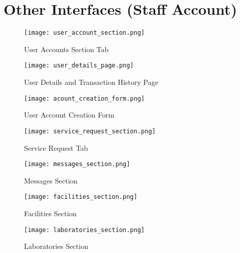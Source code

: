 %
%
%                 

\chapter{Other Interfaces (Staff Account)}
\label{sec:appendixa}



%

\begin{figure}[h]
	\centering 
	\texttt{[image: user\_account\_section.png]}
	\caption{User Accounts Section Tab}
	\label{fig:user_accounts_section}
\end{figure}

\begin{figure}[h]
	\centering 
	\texttt{[image: user\_details\_page.png]}
	\caption{User Details and Transaction History Page}
	\label{fig:user_details_page}
\end{figure}

\begin{figure}[h]
	\centering 
	\texttt{[image: acount\_creation\_form.png]}
	\caption{User Account Creation Form}
	\label{fig:acount_creation_form}
\end{figure}

\begin{figure}[h]
	\centering 
	\texttt{[image: service\_request\_section.png]}
	\caption{Service Request Tab}
	\label{fig:service request section}
\end{figure}

\begin{figure}[h]
	\centering 
	\texttt{[image: messages\_section.png]}
	\caption{Messages Section}
	\label{fig:messages section}
\end{figure}

\begin{figure}[h]
	\centering 
	\texttt{[image: facilities\_section.png]}
	\caption{Facilities Section}
	\label{fig:facilities section}
\end{figure}

\begin{figure}[h]
	\centering 
	\texttt{[image: laboratories\_section.png]}
	\caption{Laboratories Section}
	\label{fig:laboratories section}
\end{figure}
